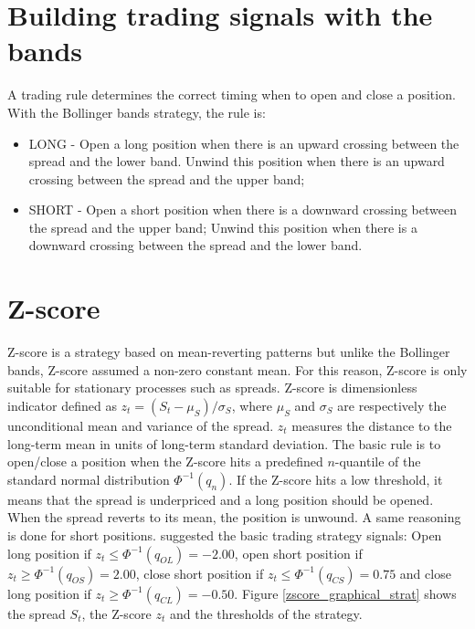 \documentclass[11pt,a4,twosided,singlespacing,titlepagenumber=on]{scrreprt}
\numberwithin{equation}{chapter} %
\theoremstyle{remark}
\begin{document}
\section{Building trading signals with the bands}

A trading rule determines the correct timing when to open and close a position. With the Bollinger bands strategy, the rule is:

\begin{itemize}
\item LONG - Open a long position when there is an upward crossing between the spread and the lower band. Unwind this position when there is an upward crossing between the spread and the upper band;
\item SHORT - Open a short position when there is a downward crossing between the spread and the upper band; Unwind this position when there is a downward crossing between the spread and the lower band.
\end{itemize}

\section{Z-score}
Z-score is a strategy based on mean-reverting patterns but unlike the Bollinger bands, Z-score assumed a non-zero constant mean. For this reason, Z-score is only suitable for stationary processes such as spreads. Z-score is dimensionless indicator defined as $z_t = (S_t-\mu_S) / \sigma_S$, where $\mu_S$ and $\sigma_S$ are respectively the unconditional mean and variance of the spread. $z_t$ measures the distance to the long-term mean in units of long-term standard deviation. The basic rule is to open/close a position when the Z-score hits a predefined $n$-quantile of the standard normal distribution $\Phi^{-1}(q_n)$. If the Z-score hits a low threshold, it means that the spread is underpriced and a long position should be opened. When the spread reverts to its mean, the position is unwound. A same reasoning is done for short positions. \cite{caldeira2013} suggested the basic trading strategy signals: Open long position if $z_t \leq \Phi^{-1}(q_{OL}) = -2.00$, open short position if $z_t \geq \Phi^{-1}(q_{OS}) = 2.00$, close short position if $z_t \leq \Phi^{-1}(q_{CS}) = 0.75$ and close long position if $z_t \geq \Phi^{-1}(q_{CL}) = -0.50$. Figure \ref{zscore_graphical_strat} shows the spread $S_t$, the Z-score $z_t$ and the thresholds of the strategy.
\end{document}
